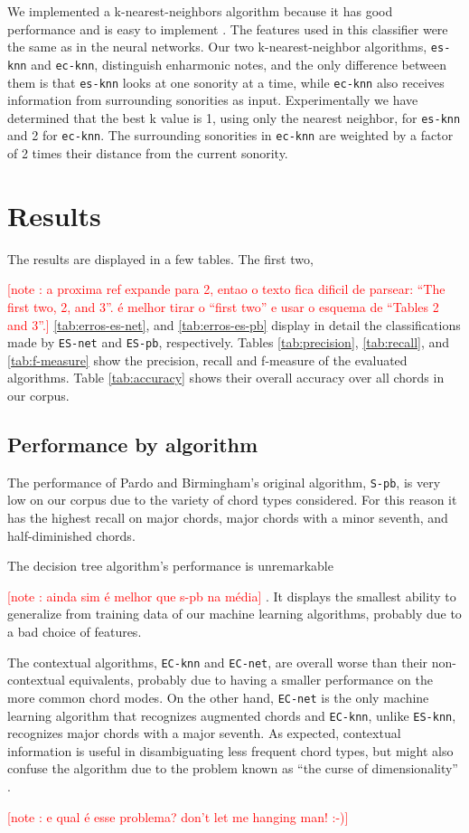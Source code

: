 \documentclass{article}
\newcounter{notecounter}
\newcommand{\note}[1]{
  \addtocounter{notecounter}{1}
  \textcolor{red}{[note \arabic{notecounter}: #1]}
}
\begin{document}
We implemented a k-nearest-neighbors algorithm because it has good
performance and is easy to implement \cite{fix.ea89:important,
  gomez.ea04:estimating}. The features used in this classifier were the
same as in the neural networks. Our two k-nearest-neighbor algorithms,
\texttt{es-knn} and \texttt{ec-knn}, distinguish enharmonic notes, and
the only difference between them is that \texttt{es-knn} looks at one
sonority at a time, while \texttt{ec-knn} also receives information
from surrounding sonorities as input. Experimentally we have
determined that the best k value is 1, using only the nearest
neighbor, for \texttt{es-knn} and 2 for \texttt{ec-knn}. The
surrounding sonorities in \texttt{ec-knn} are weighted by a factor of
2 times their distance from the current sonority.

\section{Results}
\label{sec:discussion}

The results are displayed in a few tables. The first two, \note{a
  proxima ref expande para 2, entao o texto fica dificil de parsear:
  ``The first two, 2, and 3''. é melhor tirar o ``first two'' e usar o
  esquema de ``Tables 2 and 3''.} \ref{tab:erros-es-net}, and
\ref{tab:erros-es-pb} display in detail the classifications made by
\texttt{ES-net} and \texttt{ES-pb}, respectively. Tables
\ref{tab:precision}, \ref{tab:recall}, and \ref{tab:f-measure} show
the precision, recall and f-measure of the evaluated algorithms. Table
\ref{tab:accuracy} shows their overall accuracy over all chords in our
corpus.

\subsection{Performance by algorithm}
\label{sec:algo-perf}

The performance of Pardo and Birmingham's original algorithm,
\texttt{S-pb}, is very low on our corpus due to the variety of chord
types considered. For this reason it has the highest recall on major
chords, major chords with a minor seventh, and half-diminished chords.

The decision tree algorithm's performance is unremarkable \note{ainda
  sim é melhor que s-pb na média}. It displays the smallest ability to
generalize from training data of our machine learning algorithms,
probably due to a bad choice of features.

The contextual algorithms, \texttt{EC-knn} and \texttt{EC-net}, are
overall worse than their non-contextual equivalents, probably due to
having a smaller performance on the more common chord modes. On the
other hand, \texttt{EC-net} is the only machine learning algorithm
that recognizes augmented chords and \texttt{EC-knn}, unlike
\texttt{ES-knn}, recognizes major chords with a major seventh. As
expected, contextual information is useful in disambiguating less
frequent chord types, but might also confuse the algorithm due to the
problem known as ``the curse of dimensionality''
\cite{duda.ea00:pattern}. \note{e qual é esse problema? don't let me
  hanging man! :-)}
\end{document}
